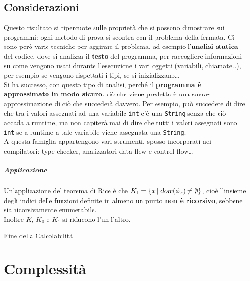 \documentclass[10pt]{book}
\begin{document}
\section{Considerazioni}
Questo risultato si ripercuote sulle proprietà che si possono dimostrare sui programmi: ogni metodo di prova si scontra con il problema della fermata. Ci sono però varie tecniche per aggirare il problema, ad esempio l'\textbf{analisi statica} del codice, dove si analizza il \textbf{testo} del programma, per raccogliere informazioni su come vengono usati durante l'esecuzione i vari oggetti (variabili, chiamate\ldots), per esempio se vengono rispettati i tipi, se si inizializzano\ldots\\
Si ha successo, con questo tipo di analisi, perché il \textbf{programma è approssimato in modo sicuro}: ciò che viene predetto è una sovra-approssimazione di ciò che succederà davvero. Per esempio, può succedere di dire che tra i valori assegnati ad una variabile \texttt{int} c'è una \texttt{String} senza che ciò accada a runtime, ma non capiterà mai di dire che tutti i valori assegnati sono \texttt{int} se a runtime a tale variabile viene assegnata una \texttt{String}.\\
A questa famiglia appartengono vari strumenti, spesso incorporati nei compilatori: type-checker, analizzatori data-flow e control-flow\ldots
\paragraph{Applicazione} Un'applicazione del teorema di Rice è che $K_1 = \{x\: |\: \textsl{dom}(\phi_x) \neq \emptyset\}$, cioè l'insieme degli indici delle funzioni definite in almeno un punto \textbf{non è ricorsivo}, sebbene sia ricorsivamente enumerabile.\\
Inoltre $K$, $K_0$ e $K_1$ si riducono l'un l'altro.
\begin{center}
Fine della Calcolabilità
\end{center}
\chapter{Complessità}
\end{document}
